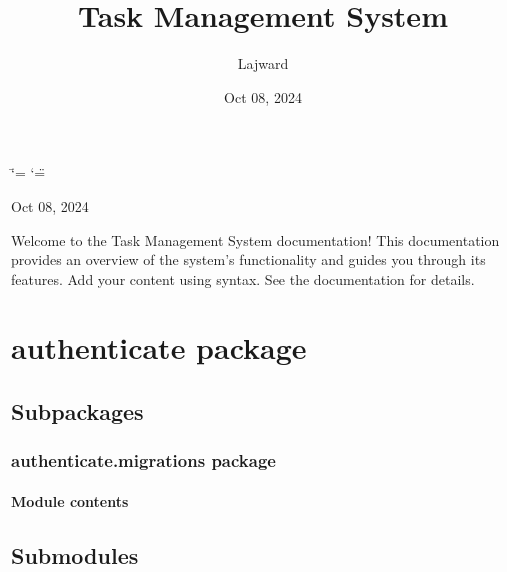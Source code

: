 \documentclass[letterpaper,10pt,english]{sphinxmanual}
\title{Task Management System}
\date{Oct 08, 2024}
\author{Lajward}
\begin{document}
\ifdefined\shorthandoff
  \ifnum\catcode`\=\string=\active\shorthandoff{=}\fi
  \ifnum\catcode`\"=\active{}\fi
\fi

\pagestyle{empty}
\sphinxmaketitle
\pagestyle{plain}
\sphinxtableofcontents
\pagestyle{normal}
\label{\detokenize{index::doc}}




\sphinxAtStartPar
Oct 08, 2024

\sphinxAtStartPar
Welcome to the Task Management System documentation! This documentation provides an overview of the system’s functionality and guides you through its features.
Add your content using  syntax. See the
documentation for details.

\sphinxstepscope


\chapter{authenticate package}
\label{\detokenize{authenticate:authenticate-package}}\label{\detokenize{authenticate::doc}}

\section{Subpackages}
\label{\detokenize{authenticate:subpackages}}
\sphinxstepscope


\subsection{authenticate.migrations package}
\label{\detokenize{authenticate.migrations:authenticate-migrations-package}}\label{\detokenize{authenticate.migrations::doc}}

\subsubsection{Module contents}
\label{\detokenize{authenticate.migrations:module-authenticate.migrations}}\label{\detokenize{authenticate.migrations:module-contents}}

\section{Submodules}
\label{\detokenize{authenticate:submodules}}
\end{document}
